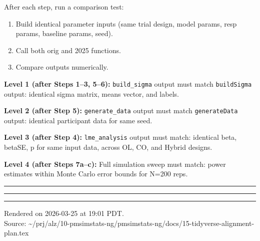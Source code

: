 \documentclass[11pt]{article}
\begin{document}
After each step, run a comparison test:

\begin{enumerate}
  \item Build identical parameter inputs (same trial design, model
    params, resp params, baseline params, seed).
  \item Call both orig and 2025 functions.
  \item Compare outputs numerically.
\end{enumerate}

\textbf{Level 1 (after Steps 1--3, 5--6):} \texttt{build\_sigma} output must
match \texttt{buildSigma} output: identical sigma matrix, means vector,
and labels.

\textbf{Level 2 (after Step 5):} \texttt{generate\_data} output must match
\texttt{generateData} output: identical participant data for same seed.

\textbf{Level 3 (after Step 4):} \texttt{lme\_analysis} output must match:
identical beta, betaSE, p for same input data, across OL, CO,
and Hybrid designs.

\textbf{Level 4 (after Steps 7a--c):} Full simulation sweep must match:
power estimates within Monte Carlo error bounds for N=200 reps.

\bigskip\noindent\rule{\textwidth}{0.4pt}\bigskip

\bigskip\noindent\rule{\textwidth}{0.4pt}\bigskip

\vfill
\noindent\rule{\textwidth}{0.4pt}
{\footnotesize
Rendered on 2026-03-25 at 19:01 PDT.\\
Source: \textasciitilde/prj/alz/10-pmsimstats-ng/pmsimstats-ng/docs/15-tidyverse-alignment-plan.tex}
\end{document}
